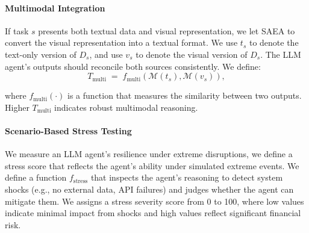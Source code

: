 \paragraph{Multimodal Integration}

If task $s$ presents both textual data and visual representation, we let SAEA to convert the visual representation into a textual format. We use $t_s$ to denote the text-only version of $D_s$, and use $v_s$ to denote the visual version of $D_s$. 
The LLM agent's outputs should reconcile both sources consistently. We define:
\begin{equation}
T_{\text{multi}} \;=\;
f_{\text{multi}}
(\mathcal{M}(t_s), \mathcal{M}(v_s)),
\end{equation}

where $f_{\text{multi}}(\cdot)$ is a function that measures the similarity between two outputs. 
Higher $T_{\text{multi}}$ indicates robust multimodal reasoning.

\paragraph{Scenario-Based Stress Testing}

We measure an LLM agent's resilience under extreme disruptions, we define a stress score that reflects the agent's ability under simulated extreme events. We define a function $f_{\text{stress}}$ that inspects the agent's reasoning to detect system shocks (e.g., no external data, API failures) and judges whether the agent can mitigate them. We assigns a stress severity score from 0 to 100, where low values indicate minimal impact from shocks and high values reflect significant financial risk.









